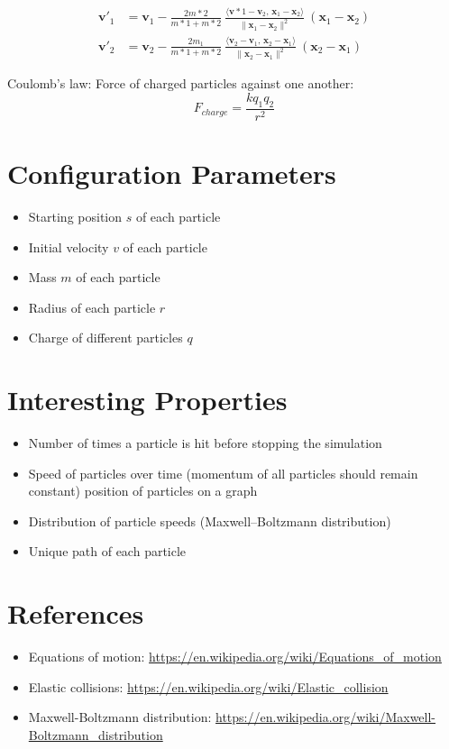 \documentclass{article}
\begin{document}
$$
\begin{aligned}
\mathbf {v} '_{1}&=\mathbf {v} _{1}-{\frac {2m*{2}}{m*{1}+m*{2}}}\ {\frac {\langle \mathbf {v} *{1}-\mathbf {v} _{2},\,\mathbf {x} _{1}-\mathbf {x} _{2}\rangle }{\|\mathbf {x} _{1}-\mathbf {x} _{2}\|^{2}}}\ (\mathbf {x} _{1}-\mathbf {x} _{2})\\
\mathbf {v} '_{2}&=\mathbf {v} _{2}-{\frac {2m_{1}}{m*{1}+m*{2}}}\ {\frac {\langle \mathbf {v} _{2}-\mathbf {v} _{1},\,\mathbf {x} _{2}-\mathbf {x} _{1}\rangle }{\|\mathbf {x} _{2}-\mathbf {x} _{1}\|^{2}}}\ (\mathbf {x} _{2}-\mathbf {x} _{1})
\end{aligned}
$$

Coulomb's law: Force of charged particles against one another:
$$F_{charge} = \frac{kq_1q_2}{r^2}$$

\section*{Configuration Parameters}
\begin{itemize}
    \item Starting position $s$ of each particle
    \item Initial velocity $v$ of each particle
    \item Mass $m$ of each particle
    \item Radius of each particle $r$
    \item Charge of different particles $q$
\end{itemize}

\section*{Interesting Properties}
\begin{itemize}
    \item Number of times a particle is hit before stopping the simulation
    \item Speed of particles over time (momentum of all particles should remain constant) position of particles on a graph
    \item Distribution of particle speeds (Maxwell–Boltzmann distribution)
    \item Unique path of each particle
\end{itemize}

\section*{References}
\begin{itemize}
    \item Equations of motion: \url{https://en.wikipedia.org/wiki/Equations_of_motion}
    \item Elastic collisions: \url{https://en.wikipedia.org/wiki/Elastic_collision}
    \item Maxwell-Boltzmann distribution: \url{https://en.wikipedia.org/wiki/Maxwell-Boltzmann_distribution}
\end{itemize}
\end{document}
